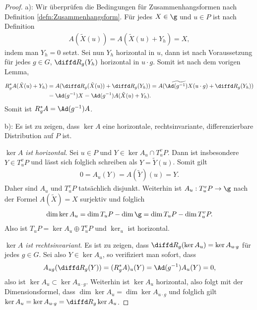 \documentclass[%
	paper=a5,%
	fleqn,%
	DIV=18,%
	BCOR=0mm,
	fontsize=11pt,
	titlepage=false,%
	bibliography=totoc,
	DIV=18,%
	twoside=true,
	pdftitle=Riemannsche Geometrie,
	pdfauthor=Uwe Semmelmann,
	numbers=noendperiod]%
	{scrbook}
\begin{document}
\begin{proof}
a): Wir überprüfen die Bedingungen für Zusammenhangsformen nach Definition
\ref{defn:Zusammenhangsform}. Für jedes $X\in \g$ und $u\in P$ ist nach
Definition
\begin{align*}
A(\tilde{X}(u)) = A(\tilde{X}(u)+Y_h) = X,
\end{align*}
indem man $Y_h = 0$ setzt. Sei nun $Y_h$ horizontal in $u$, dann ist nach
Voraussetzung für jedes $g\in G$, $\diffd R_g(Y_h)$ horizontal in $u\cdot g$.
Somit ist nach dem vorigen Lemma,
\begin{align*}
R_g^* A(\tilde{X}(u)+Y_h) &= 
A(\diffd R_g (\tilde{X}(u)) + \diffd R_g (Y_h))
= A(\widetilde{\Ad(g^{-1})X}(u\cdot g) + \diffd R_g (Y_h))\\
&= \Ad(g^{-1})X
= \Ad(g^{-1})A(\tilde{X}(u) + Y_h).
\end{align*}
Somit ist $R_g^* A = \Ad(g^{-1})A$.

b): Es ist zu zeigen, dass $\ker A$ eine horizontale, rechtsinvariante,
differenzierbare Distribution auf $P$ ist.

\textit{$\ker A$ ist horizontal}. Sei $u\in P$ und $Y\in \ker A_u\cap T^v_uP$.
Dann ist insbesondere $Y\in T^v_uP$ und lässt sich folglich schreiben als
$Y=\tilde{Y}(u)$. Somit gilt
\begin{align*}
0 = A_u(Y) = A(\tilde{Y})(u) = Y.  
\end{align*}
Daher sind $A_u$ und $T^v_uP$ tatsächlich
disjunkt. Weiterhin ist $A_u: T^v_uP \to \g$ nach der Formel $A(\tilde{X}) =
X$ surjektiv und folglich
\begin{align*}
\dim \ker A_u = \dim T_uP - \dim \g = \dim T_uP - \dim T^v_uP.
\end{align*}
Also ist $T_uP = \ker A_u\oplus T^v_uP$ und $\ker_u$ ist horizontal.

\textit{$\ker A$ ist rechtsinvariant}. Es ist zu zeigen, dass $\diffd R_g(\ker
A_u) = \ker A_{u\cdot g}$ für jedes $g\in
G$. Sei also $Y\in \ker A_u$, so verifiziert man sofort, dass
\begin{align*}
A_{ug}(\diffd R_g(Y)) = (R_g^* A)_u(Y)
= \Ad(g^{-1})A_u(Y) = 0,
\end{align*}
also ist $\ker A_u \subset \ker A_{u\cdot g}$. Weiterhin ist $\ker A_u$
horizontal, also folgt mit der Dimensionsformel, dass $\dim \ker A_u = \dim
\ker A_{u\cdot g}$ und folglich gilt $\ker A_u = \ker A_{u\cdot g} = \diffd
R_{g} \ker A_u$.


\end{proof}
\end{document}
